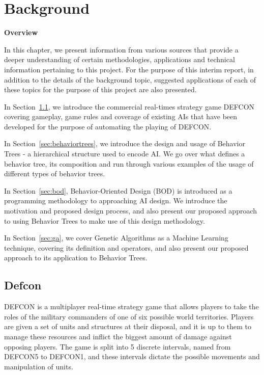 \chapter{Background}
    
\textbf{\LARGE{Overview}}

In this chapter, we present information from various sources that provide a deeper understanding of certain methodologies, applications and technical information pertaining to this project. For the purpose of this interim report, in addition to the details of the background topic, suggested applications of each of these topics for the purpose of this project are also presented.

In Section~\ref{sec:defcon}, we introduce the commercial real-times strategy game DEFCON covering gameplay, game rules and coverage of existing AIs that have been developed for the purpose of automating the playing of DEFCON.

In Section~\ref{sec:behaviortrees}, we introduce the design and usage of Behavior Trees - a hierarchical structure used to encode AI. We go over what defines a behavior tree, its composition and run through various examples of the usage of different types of behavior trees. 

In Section~\ref{sec:bod}, Behavior-Oriented Design (BOD) is introduced as a programming methodology to approaching AI design. We introduce the motivation and proposed design process, and also present our proposed approach to using Behavior Trees to make use of this design methodology.

In Section~\ref{sec:ga}, we cover Genetic Algorithms as a Machine Learning technique, covering its definition and operators, and also present our proposed approach to its application to Behavior Trees.

    \newpage
    
    \section{Defcon}
    \label{sec:defcon}
        DEFCON is a multiplayer real-time strategy game that allows players to take the roles of the military commanders of one of six possible world territories. Players are given a set of units and structures at their disposal, and it is up to them to manage these resources and inflict the biggest amount of damage against opposing players. The game is split into 5 discrete intervals, named from DEFCON5 to DEFCON1, and these intervals dictate the possible movements and manipulation of units. 
        
